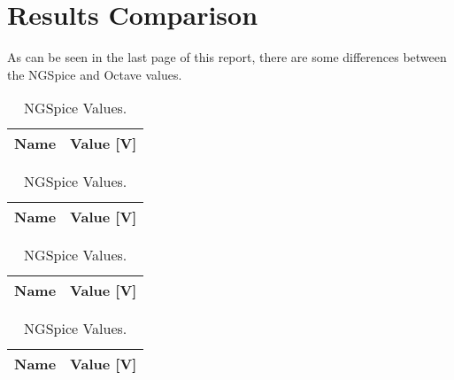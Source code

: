 \section{Results Comparison}
\label{sec:comparison}


As can be seen in the last page of this report, there are some differences between the NGSpice and Octave values.


\begin{table}[h]
        \parbox{.45\linewidth}{
  \centering
  \begin{tabular}{|l|r|}
    \hline
    {\bf Name} & {\bf Value [V]} \\ \hline
	    
	    
  \end{tabular}
  \caption{Octave Values.}                              
        \label{tab:comp1a}      
}
\hfill
        \parbox{.45\linewidth}{
  \centering
  \begin{tabular}{|l|r|}
    \hline
    {\bf Name} & {\bf Value [V]} \\ \hline
	   
  \end{tabular}
  \caption{NGSpice Values.}                              
  \label{tab:comp1b} 
}
\end{table}

\begin{table}[h]
        \parbox{.45\linewidth}{
  \centering
  \begin{tabular}{|l|r|}
    \hline
    {\bf Name} & {\bf Value [V]} \\ \hline
     
  \end{tabular}
  \caption{Octave Values.}
        \label{tab:comp2a}
}
\hfill
        \parbox{.45\linewidth}{
  \centering
  \begin{tabular}{|l|r|}
    \hline
    {\bf Name} & {\bf Value [V]} \\ \hline
	
  \end{tabular}
  \caption{NGSpice Values.}
  \label{tab:comp2b}
}
\end{table}




